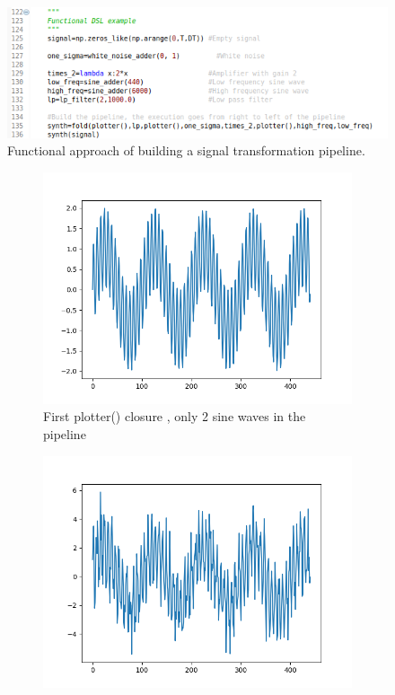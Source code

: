 \documentclass[margin,line,a4paper,authoryear,12pt]{report}
\begin{document}
\begin{figure}[h!]
    \centering
    \includegraphics[width=\linewidth]{dsl_functional_example.png}
    \caption{ Functional approach of building a signal transformation pipeline.}
    \label{fig:dsl_oop}
\end{figure}

\begin{figure}[h!]
    \begin{subfigure}{0.3\linewidth}
        \centering
        \includegraphics[width=\linewidth]{func_2_sines.png}
        \caption{First plotter() closure , only 2 sine waves in the pipeline}
        \label{fig:SonarCloud}
    \end{subfigure}
    \begin{subfigure}{0.3\linewidth}
        \centering
        \includegraphics[width=\linewidth]{func_2_sines_noise.png}

\end{subfigure}
\end{figure}
\end{document}
